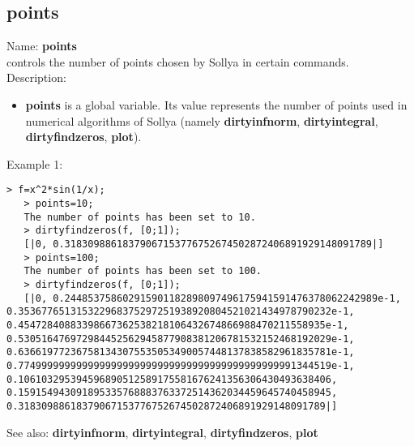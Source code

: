 \subsection{ points }
\noindent Name: \textbf{points}\\
controls the number of points chosen by Sollya in certain commands.\\

\noindent Description: \begin{itemize}

\item \textbf{points} is a global variable. Its value represents the number of points
   used in numerical algorithms of Sollya (namely \textbf{dirtyinfnorm},
   \textbf{dirtyintegral}, \textbf{dirtyfindzeros}, \textbf{plot}).
\end{itemize}
\noindent Example 1: 
\begin{center}\begin{minipage}{14.8cm}\begin{Verbatim}[frame=single]
   > f=x^2*sin(1/x);
   > points=10;
   The number of points has been set to 10.
   > dirtyfindzeros(f, [0;1]);
   [|0, 0.31830988618379067153776752674502872406891929148091789|]
   > points=100;
   The number of points has been set to 100.
   > dirtyfindzeros(f, [0;1]);
   [|0, 0.244853758602915901182898097496175941591476378062242989e-1, 0.353677651315322968375297251938920804521021434978790232e-1, 0.45472840883398667362538218106432674866988470211558935e-1, 0.530516476972984452562945877908381206781532152468192029e-1, 0.636619772367581343075535053490057448137838582961835781e-1, 0.774999999999999999999999999999999999999999999991344519e-1, 0.106103295394596890512589175581676241356306430493638406, 0.159154943091895335768883763372514362034459645740458945, 0.31830988618379067153776752674502872406891929148091789|]
\end{Verbatim}
\end{minipage}\end{center}
See also: \textbf{dirtyinfnorm}, \textbf{dirtyintegral}, \textbf{dirtyfindzeros}, \textbf{plot}
